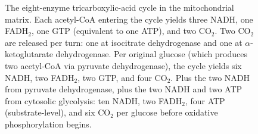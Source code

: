 \begin{figure}[htbp]
\caption[The TCA cycle ledger]{The eight-enzyme tricarboxylic-acid
cycle in the mitochondrial matrix. Each acetyl-CoA entering the cycle
yields three NADH, one FADH$_2$, one GTP (equivalent to one ATP), and
two CO$_2$. Two CO$_2$ are released per turn: one at isocitrate
dehydrogenase and one at $\alpha$-ketoglutarate dehydrogenase. Per
original glucose (which produces two acetyl-CoA via pyruvate
dehydrogenase), the cycle yields six NADH, two FADH$_2$, two GTP, and
four CO$_2$. Plus the two NADH from pyruvate dehydrogenase, plus the
two NADH and two ATP from cytosolic glycolysis: ten NADH, two
FADH$_2$, four ATP (substrate-level), and six CO$_2$ per glucose
before oxidative phosphorylation begins.}
\label{fig:vol06:ch02:tca}
\end{figure}
